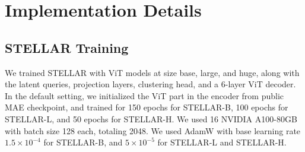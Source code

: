 \appendix





\section{Implementation Details}
\subsection{STELLAR Training}
We trained STELLAR with ViT models at size base, large, and huge, along with the latent queries, projection layers, clustering head, and a 6-layer ViT decoder. In the default setting, we initialized the ViT part in the encoder from public MAE checkpoint, and trained for 150 epochs for STELLAR-B, 100 epochs for STELLAR-L, and 50 epochs for STELLAR-H. We used 16 NVIDIA A100-80GB with batch size 128 each, totaling 2048. We used AdamW\citep{loshchilov2017decoupled} with base learning rate $1.5\times10^{-4}$ for STELLAR-B, and $5\times10^{-5}$ for STELLAR-L and STELLAR-H.


